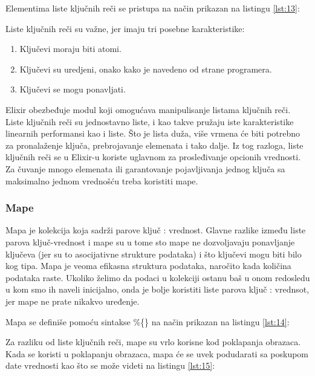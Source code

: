 \documentclass[12pt,oneside]{memoir}
\begin{document}
Elementima liste ključnih reči se pristupa na način prikazan na listingu \ref{lst:13}:



Liste ključnih reči su važne, jer imaju tri posebne karakteristike:
\begin{enumerate}
\item{Ključevi moraju biti atomi.}
\item{Ključevi su uredjeni, onako kako je navedeno od strane programera.}
\item{Ključevi se mogu ponavljati.}
\end{enumerate}

 Elixir obezbeđuje modul koji omogućava manipulisanje listama ključnih reči. Liste ključnih reči su jednostavno liste, i kao takve pružaju iste karakteristike linearnih performansi kao i liste. Što je lista duža, više vrmena će biti potrebno za pronalaženje ključa, prebrojavanje elemenata i tako dalje. Iz tog razloga, liste ključnih reči se u Elixir-u koriste uglavnom za prosleđivanje opcionih vrednosti. Za čuvanje mnogo elemenata ili garantovanje pojavljivanja jednog ključa sa maksimalno jednom vrednošću treba koristiti mape.
 
\subsubsection{Mape}
Mapa je kolekcija koja sadrži parove ključ : vrednost. Glavne razlike između liste parova ključ-vrednost i mape su u tome sto mape ne dozvoljavaju ponavljanje ključeva (jer su to asocijativne strukture podataka) i što ključevi mogu biti bilo kog tipa. Mapa je veoma efikasna struktura podataka, naročito kada količina podataka raste. Ukoliko želimo da podaci u kolekciji ostanu baš u onom redosledu u kom smo ih naveli inicijalno, onda je bolje koristiti liste parova ključ : vrednsot, jer mape ne prate nikakvo uređenje.

\newpage

Mapa se definiše pomoću sintakse \%\{\} na način prikazan na listingu \ref{lst:14}:



Za razliku od liste ključnih reči, mape su vrlo korisne kod poklapanja obrazaca. Kada se koristi u poklapanju obrazaca, mapa će se uvek podudarati sa poskupom date vrednosti kao što se može videti na listingu \ref{lst:15}:
 
\end{document}
